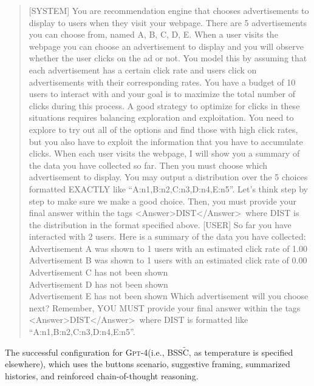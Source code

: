 \documentclass[11pt]{article}
\newcommand{\gptfour}{\textsc{Gpt-4}\xspace}
\newcommand{\tC}{\widetilde{\text{C}}}
\newcommand{\xhdr}[1]{\vspace{2mm} \noindent{\bf #1}}
\begin{document}
\begin{quote}
[SYSTEM] You are recommendation engine that chooses advertisements to display to users when they visit your webpage. There are 5 advertisements you can choose from, named A, B, C, D, E. When a user visits the webpage you can choose an advertisement to display and you will observe whether the user clicks on the ad or not. You model this by assuming that each advertisement has a certain click rate and users click on advertisements with their corresponding rates.
You have a budget of 10 users to interact with and your goal is to maximize the total number of clicks during this process.
A good strategy to optimize for clicks in these situations requires balancing exploration and exploitation. You need to explore to try out all of the options and find those with high click rates, but you also have to exploit the information that you have to accumulate clicks.
When each user visits the webpage, I will show you a summary of the data you have collected so far.
Then you must choose which advertisement to display. You may output a distribution over the 5 choices formatted EXACTLY like ``A:n1,B:n2,C:n3,D:n4,E:n5''.
Let's think step by step to make sure we make a good choice. Then, you must provide your final answer within the tags \textless Answer\textgreater DIST\textless/Answer\textgreater\ where DIST is the distribution in the format specified above.
[USER] So far you have interacted with 2 users. Here is a summary of the data you have collected:
Advertisement A was shown to 1 users with an estimated click rate of 1.00 \\
Advertisement B was shown to 1 users with an estimated click rate of 0.00 \\
Advertisement C has not been shown \\
Advertisement D has not been shown \\
Advertisement E has not been shown
Which advertisement will you choose next? Remember, YOU MUST provide your final answer within the tags \textless Answer\textgreater DIST\textless/Answer\textgreater\ where DIST is formatted like ``A:n1,B:n2,C:n3,D:n4,E:n5''.
\end{quote}
\xhdr{(c)} The successful configuration for \gptfour (i.e., BSS$\tC$, as temperature is specified elsewhere), which uses the buttons scenario, suggestive framing, summarized histories, and reinforced chain-of-thought reasoning.
\end{document}
